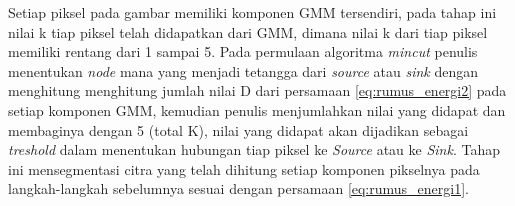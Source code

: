 Setiap piksel pada gambar memiliki komponen GMM tersendiri, pada tahap ini nilai k
tiap piksel telah didapatkan dari GMM, dimana nilai k dari tiap piksel memiliki rentang
dari 1 sampai 5. Pada permulaan algoritma \emph{mincut} penulis menentukan \emph{node}
mana yang menjadi tetangga dari \emph{source} atau \emph{sink} dengan menghitung
menghitung jumlah nilai D dari persamaan \ref{eq:rumus_energi2} pada setiap komponen GMM, 
kemudian penulis menjumlahkan nilai yang didapat dan membaginya dengan 5 (total K),
nilai yang didapat akan dijadikan sebagai \emph{treshold} dalam menentukan hubungan
tiap piksel ke \emph{Source} atau ke \emph{Sink}. Tahap ini mensegmentasi citra 
yang telah dihitung setiap komponen pikselnya pada langkah-langkah sebelumnya sesuai 
dengan persamaan \ref{eq:rumus_energi1}.




	





